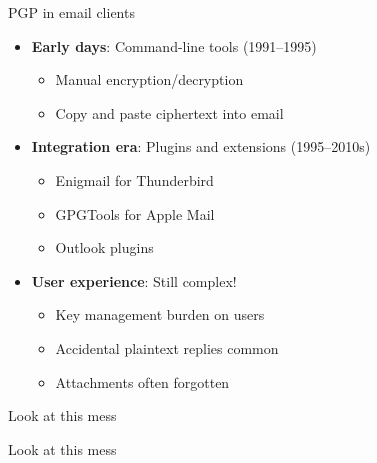 \ifdefined\PRESENTATION\else\PassOptionsToClass{handout}{beamer}\fi\documentclass[aspectratio=169, lualatex]{beamer}
\begin{document}
\begin{frame}{PGP in email clients}
	\begin{itemize}
		\item \textbf{Early days}: Command-line tools (1991--1995)
		      \begin{itemize}
			      \item Manual encryption/decryption
			      \item Copy and paste ciphertext into email
		      \end{itemize}
		\item \textbf{Integration era}: Plugins and extensions (1995--2010s)
		      \begin{itemize}
			      \item Enigmail for Thunderbird
			      \item GPGTools for Apple Mail
			      \item Outlook plugins
		      \end{itemize}
		\item \textbf{User experience}: Still complex!
		      \begin{itemize}
			      \item Key management burden on users
			      \item Accidental plaintext replies common
			      \item Attachments often forgotten
		      \end{itemize}
	\end{itemize}
\end{frame}

\begin{frame}{Look at this mess}
\end{frame}

\begin{frame}{Look at this mess}
\end{frame}
\end{document}
